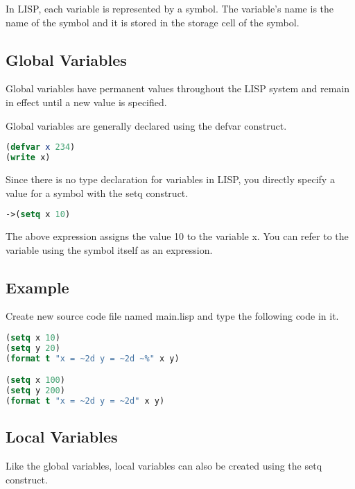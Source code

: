 \documentclass[12pt]{book}
\begin{document}
In LISP, each variable is represented by a symbol. The variable's name is the name of the symbol and it is stored in the storage cell of the symbol.

\subsection{Global Variables}

Global variables have permanent values throughout the LISP system and remain in effect until a new value is specified.

Global variables are generally declared using the defvar construct.

\lstset{style=mystyle}
\begin{lstlisting}[language=Lisp, caption=Lisp example]
(defvar x 234)
(write x)
\end{lstlisting}


Since there is no type declaration for variables in LISP, you directly specify a value for a symbol with the setq construct.


\lstset{style=mystyle}
\begin{lstlisting}[language=Lisp, caption=Lisp example]
->(setq x 10)
\end{lstlisting}



The above expression assigns the value 10 to the variable x. You can refer to the variable using the symbol itself as an expression.



\subsection{Example}

Create new source code file named main.lisp and type the following code in it.

\lstset{style=mystyle}
\begin{lstlisting}[language=Lisp, caption=Lisp example]
(setq x 10)
(setq y 20)
(format t "x = ~2d y = ~2d ~%" x y)

(setq x 100)
(setq y 200)
(format t "x = ~2d y = ~2d" x y)
\end{lstlisting}



\subsection{Local Variables}

Like the global variables, local variables can also be created using the setq construct.
\end{document}

